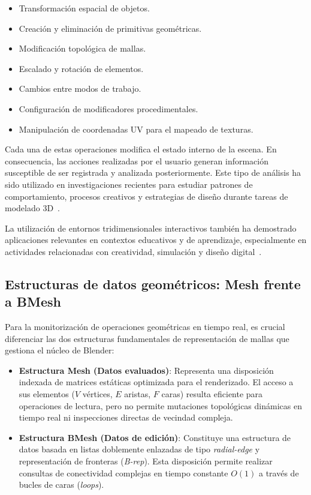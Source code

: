 \begin{itemize}
\item Transformación espacial de objetos.
\item Creación y eliminación de primitivas geométricas.
\item Modificación topológica de mallas.
\item Escalado y rotación de elementos.
\item Cambios entre modos de trabajo.
\item Configuración de modificadores procedimentales.
\item Manipulación de coordenadas UV para el mapeado de texturas.
\end{itemize}

Cada una de estas operaciones modifica el estado interno de la escena. En consecuencia, las acciones realizadas por el usuario generan información susceptible de ser registrada y analizada posteriormente. Este tipo de análisis ha sido utilizado en investigaciones recientes para estudiar patrones de comportamiento, procesos creativos y estrategias de diseño durante tareas de modelado 3D~\cite{casakin2023,chen2022,gao2021,liu2022,wang2024}.

La utilización de entornos tridimensionales interactivos también ha demostrado aplicaciones relevantes en contextos educativos y de aprendizaje, especialmente en actividades relacionadas con creatividad, simulación y diseño digital~\cite{koh2010,krassmann2018,sosna2025}.

\subsection{Estructuras de datos geométricos: Mesh frente a BMesh}

Para la monitorización de operaciones geométricas en tiempo real, es crucial diferenciar las dos estructuras fundamentales de representación de mallas que gestiona el núcleo de Blender:

\begin{itemize}
    \item \textbf{Estructura Mesh (Datos evaluados)}: Representa una disposición indexada de matrices estáticas optimizada para el renderizado. El acceso a sus elementos ($V$ vértices, $E$ aristas, $F$ caras) resulta eficiente para operaciones de lectura, pero no permite mutaciones topológicas dinámicas en tiempo real ni inspecciones directas de vecindad compleja.
    \item \textbf{Estructura BMesh (Datos de edición)}: Constituye una estructura de datos basada en listas doblemente enlazadas de tipo \textit{radial-edge} y representación de fronteras (\textit{B-rep}). Esta disposición permite realizar consultas de conectividad complejas en tiempo constante $O(1)$ a través de bucles de caras (\textit{loops}). 
\end{itemize}

